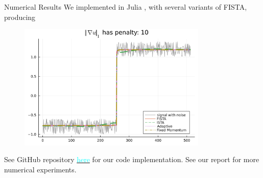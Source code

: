 \documentclass[11pt]{beamer}
\theoremstyle{definition}
\begin{document}
    \begin{frame}{Numerical Results}
        We implemented in Julia \cite{bezanson_julia_2017}, with several variants of FISTA, producing 
        \begin{figure}[H]
            \includegraphics[width=9cm]{Assets/recovered_signal.png}    
        \end{figure}
        {\small
            See GitHub repository \href{https://github.com/iluvjava/Proximal-Gradient/tree/main/applications}{\textcolor{cyan}{here}} for our code implementation. 
            See our report for more numerical experiments. 
        }
    \end{frame}
\end{document}
